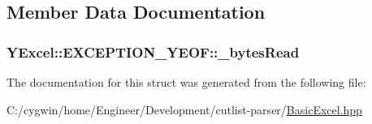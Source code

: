 \subsection{Member Data Documentation}
\hypertarget{struct_y_excel_1_1_e_x_c_e_p_t_i_o_n___y_e_o_f_a005cf5e9f84a7082bcc8b568e81df74b}{}
\subsubsection[{\+\_\+bytes\+Read}]{ Y\+Excel\+::\+E\+X\+C\+E\+P\+T\+I\+O\+N\+\_\+\+Y\+E\+O\+F\+::\+\_\+bytes\+Read}\label{struct_y_excel_1_1_e_x_c_e_p_t_i_o_n___y_e_o_f_a005cf5e9f84a7082bcc8b568e81df74b}


The documentation for this struct was generated from the following file\+:\begin{DoxyCompactItemize}
\item 
C\+:/cygwin/home/\+Engineer/\+Development/cutlist-\/parser/\hyperlink{_basic_excel_8hpp}{Basic\+Excel.\+hpp}\end{DoxyCompactItemize}
